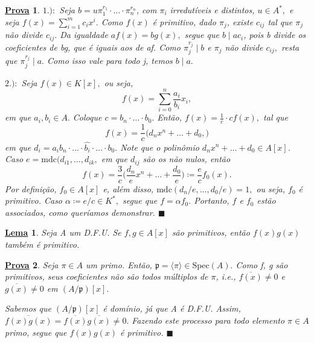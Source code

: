 \documentclass{article}
\newtheorem*{lemma*}{\underline{Lema}}
\newtheorem*{proof*}{\underline{Prova}}
\renewcommand\qedsymbol{$\blacksquare$}
\begin{document}
    \begin{proof*}
      \(1.):\) Seja \(b = u\pi_{1}^{r_{1}}\cdot \dotsc \cdot \pi_{n}^{r_{n}}\), com \(\pi_{i}\) irredutíveis e distintos, \(u\in A^{*},\)
      e seja \(f(x) = \sum\limits_{i=1}^{m}c_{i}x^{i}.\) Como \(f(x)\) é primitivo, dado \(\pi_{j}\), existe \(c_{ij}\) tal que \(\pi_{j}\) 
      não divide \(c_{ij}.\) Da igualdade \(af(x) = bg(x),\) segue que \(b\mid ac_{i}\), pois b divide os coeficientes
      de bg, que é iguais aos de af. Como \(\pi_{j}^{r_{j}}\mid b\) e \(\pi_{j}\) não divide \(c_{ij},\) resta que \(\pi_{j}^{r_{j}}\mid a.\) 
      Como isso vale para todo j, temos \(b\mid a.\)

      \(2.):\) Seja \(f(x)\in K[x],\) ou seja, 
      \[
        f(x) = \sum\limits_{i=0}^{n}\frac{a_{i}}{b_{i}}x_{i},
      \]
      em que \(a_{i}, b_{i}\in A.\) Coloque \(c = b_{n}\cdot \dotsc \cdot b_{0}.\) Então,
      \(f(x) = \frac{1}{c} \cdot cf(x),\) tal que 
      \[
        f(x) = \frac{1}{c}\biggl(d_{n}x^{n}+ \dotsc +d_{0},\biggr)
      \]
      em que \(d_{i} = a_{i}b_{n} \cdot \dotsc \cdot \hat{b_{i}}\cdot \dotsc \cdot b_{0}.\) Note que o polinômio 
      \(d_{n}x^{n} + \dotsc  + d_{0}\in A[x]\).
      Caso \(e = \mathrm{mdc}(d_{i1}, \dotsc , d_{ik},\) em que \(d_{ij}\) são os não nulos, então 
      \[
        f(x) = \frac{3}{c}\biggl(\frac{d_{n}}{e}x^{n} + \dotsc + \frac{d_{0}}{e}\biggr)\coloneqq \frac{e}{c}f_{0}(x).
      \]
      Por definição, \(f_{0}\in A[x]\) e, além disso, \(\mathrm{mdc}(d_{n}/e, \dotsc , d_{0}/e) = 1,\) ou seja, \(f_{0}\) é primitivo.
      Caso \(\alpha\coloneqq e/c \in K^{*},\) segue que \(f = \alpha f_{0}.\) Portanto, \(f\) e \(f_{0}\) estão associados, como queríamos demonstrar. \qedsymbol
    \end{proof*}
    \begin{lemma*}
      Seja A um D.F.U. Se \(f, g\in A[x]\) são primitivos, então \(f(x)g(x)\) também é primitivo.
    \end{lemma*}
    \begin{proof*}
      Seja \(\pi \in A\) um primo. Então, \(\mathfrak{p} = \langle \pi  \rangle\in \mathrm{Spec}(A).\) Como f, g
      são primitivos, seus coeficientes não são todos múltiplos de \(\pi \), i.e., \(\overline{f(x)}\neq 0\) e 
      \(\overline{g(x)}\neq 0\) em \((A/\mathfrak{p})[x].\)

      Sabemos que \((A/\mathfrak{p})[x]\) é domínio, já que A é D.F.U. Assim, \(\overline{f(x)g(x)} = \overline{f(x)}\overline{g(x)}\neq0.\) Fazendo este processo para 
      todo elemento \(\pi \in A\) primo, segue que \(f(x)g(x)\) é primitivo. \qedsymbol
    \end{proof*}
\end{document}
